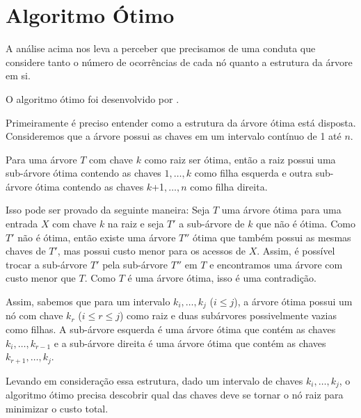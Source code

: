 \section{Algoritmo Ótimo}

A análise acima nos leva a perceber que precisamos de uma conduta que considere tanto o número de ocorrências de cada nó quanto a estrutura da árvore em si.

O algoritmo ótimo foi desenvolvido por \cite{knuth}.

Primeiramente é preciso entender como a estrutura da árvore ótima está disposta. Consideremos que a árvore possui as chaves em um intervalo contínuo de 1 até $n$. 

Para uma árvore $T$ com chave $k$ como raiz ser ótima, então a raiz possui uma sub-árvore ótima contendo as chaves $1,\dots,k$ como filha esquerda e outra sub-árvore ótima contendo as chaves $k$+1$,\dots,n$ como filha direita.

Isso pode ser provado da seguinte maneira: Seja $T$ uma árvore ótima para uma entrada $X$ com chave $k$ na raiz e seja $T'$ a sub-árvore de $k$ que não é ótima. Como $T'$ não é ótima, então existe uma árvore $T''$ ótima que também possui as mesmas chaves de $T'$, mas possui custo menor para os acessos de $X$. Assim, é possível trocar a sub-árvore $T'$ pela sub-árvore $T''$ em $T$ e encontramos uma árvore com custo menor que $T$. Como $T$ é uma árvore ótima, isso é uma contradição.

Assim, sabemos que para um intervalo $k_i, \ldots, k_j$ ($i \leq j$), a árvore ótima possui um nó com chave $k_r$ ($i \leq r \leq j$) como raiz e duas subárvores possivelmente vazias como filhas. A sub-árvore esquerda é uma árvore ótima que contém as chaves $k_i, \ldots, k_{r-1}$ e a sub-árvore direita é uma árvore ótima que contém as chaves $k_{r+1}, \ldots, k_j$.

Levando em consideração essa estrutura, dado um intervalo de chaves $k_i, \ldots, k_j$, o algoritmo ótimo precisa descobrir qual das chaves deve se tornar o nó raiz para minimizar o custo total.